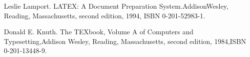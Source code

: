 
\songti\xiaosi
\renewcommand\bibnumfmt[1]{\makebox[1.5em][l]{[#1]}}
\begin{thebibliography}{1}
	\setlength{\baselineskip}{18pt}
	\setlength\itemsep{0pt}

Leslie Lamport. LATEX: A Document Preparation System.AddisonWesley, Reading, Massachusetts, second edition, 1994, ISBN 0-201-52983-1.

Donald E. Knuth. The TEXbook, Volume A of Computers and Typesetting,Addison Wesley, Reading, Massachusetts, second edition, 1984,ISBN 0-201-13448-9.

\end{thebibliography}